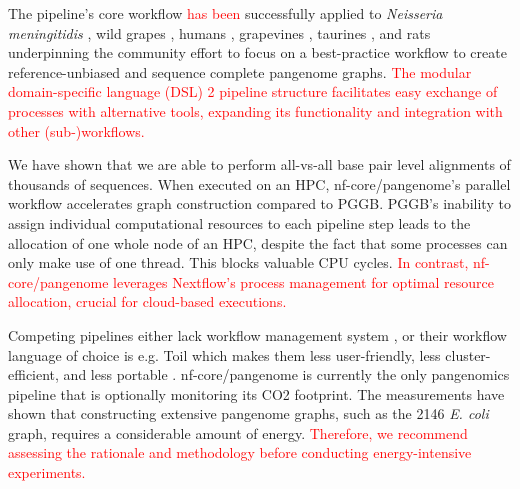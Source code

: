 \documentclass{bioinfo}
\theoremstyle{definition}
\newcommand{\red}[1]{{\textcolor{Red}{#1}}}
\begin{document}
	The pipeline’s core workflow \red{has been} successfully applied to \textit{Neisseria meningitidis} \citep{Yang2023}, wild grapes \citep{Cochetel2023}, humans \citep{Guarracino2023, Liao2023}, grapevines \citep{Guo2024}, taurines \citep{Milia2024}, and rats \citep{Villani2024} underpinning the community effort to focus on a best-practice workflow to create reference-unbiased and sequence complete pangenome graphs. 
	\red{The modular domain-specific language (DSL) 2 pipeline structure facilitates easy exchange of processes with alternative tools, expanding its functionality and integration with other (sub-)workflows.}
	
	We have shown that we are able to perform all-vs-all base pair level alignments of thousands of sequences. 
	When executed on an HPC, nf-core/pangenome’s parallel workflow accelerates graph construction compared to PGGB. 
	PGGB’s inability to assign individual computational resources to each pipeline step leads to the allocation of one whole node of an HPC, despite the fact that some processes can only make use of one thread. 
	This blocks valuable CPU cycles.
	\red{In contrast, nf-core/pangenome leverages Nextflow’s process management for optimal resource allocation, crucial for cloud-based executions.} %
	
	Competing pipelines either lack workflow management system \citep{Chin2023}, or their workflow language of choice is e.g. Toil \citep{Vivian2017, Hickey2023} which makes them less user-friendly, less cluster-efficient, and less portable \citep{Wratten2021}.
	nf-core/pangenome is currently the only pangenomics pipeline that is optionally monitoring its CO2 footprint. 
	The measurements have shown that constructing extensive pangenome graphs, such as the 2146 \textit{E. coli} graph, requires a considerable amount of energy. 
	\red{Therefore, we recommend assessing the rationale and methodology before conducting energy-intensive experiments.}
	
\end{document}
